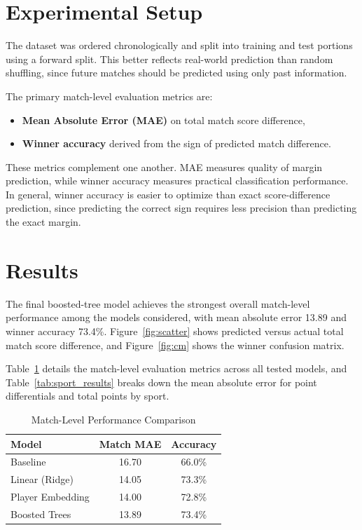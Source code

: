 \documentclass[10pt,twocolumn]{article}
\begin{document}
\section{Experimental Setup}

The dataset was ordered chronologically and split into training and test portions using a forward split. This better reflects real-world prediction than random shuffling, since future matches should be predicted using only past information.

The primary match-level evaluation metrics are:
\begin{itemize}[leftmargin=1.2em,itemsep=0.25em]
    \item \textbf{Mean Absolute Error (MAE)} on total match score difference,
    \item \textbf{Winner accuracy} derived from the sign of predicted match difference.
\end{itemize}

These metrics complement one another. MAE measures quality of margin prediction, while winner accuracy measures practical classification performance. In general, winner accuracy is easier to optimize than exact score-difference prediction, since predicting the correct sign requires less precision than predicting the exact margin.

\section{Results}

The final boosted-tree model achieves the strongest overall match-level performance among the models considered, with mean absolute error 13.89 and winner accuracy 73.4\%. Figure~\ref{fig:scatter} shows predicted versus actual total match score difference, and Figure~\ref{fig:cm} shows the winner confusion matrix.

Table~\ref{tab:results} details the match-level evaluation metrics across all tested models, and Table~\ref{tab:sport_results} breaks down the mean absolute error for point differentials and total points by sport.

\begin{table}[H]
    \centering
    \caption{Match-Level Performance Comparison}
    \label{tab:results}
    \begin{tabular}{lcc}
        \toprule
        Model            & Match MAE & Accuracy \\
        \midrule
        Baseline         & 16.70     & 66.0\%   \\
        Linear (Ridge)   & 14.05     & 73.3\%   \\
        Player Embedding & 14.00     & 72.8\%   \\
        Boosted Trees    & 13.89     & 73.4\%   \\
        \bottomrule
    \end{tabular}
\end{table}
\end{document}
